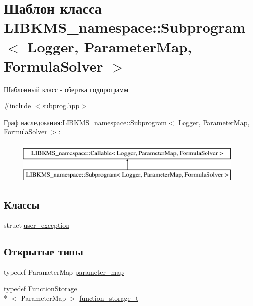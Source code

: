 \hypertarget{classLIBKMS__namespace_1_1Subprogram}{\section{Шаблон класса L\-I\-B\-K\-M\-S\-\_\-namespace\-:\-:Subprogram$<$ Logger, Parameter\-Map, Formula\-Solver $>$}
\label{classLIBKMS__namespace_1_1Subprogram}
}


Шаблонный класс -\/ обертка подпрограмм  




{\ttfamily \#include $<$subprog.\-hpp$>$}

Граф наследования\-:L\-I\-B\-K\-M\-S\-\_\-namespace\-:\-:Subprogram$<$ Logger, Parameter\-Map, Formula\-Solver $>$\-:\begin{figure}[H]
\begin{center}
\leavevmode
\includegraphics[height=2.000000cm]{classLIBKMS__namespace_1_1Subprogram}
\end{center}
\end{figure}
\subsection*{Классы}
\begin{DoxyCompactItemize}
\item 
struct \hyperlink{structLIBKMS__namespace_1_1Subprogram_1_1user__exception}{user\-\_\-exception}
\end{DoxyCompactItemize}
\subsection*{Открытые типы}
\begin{DoxyCompactItemize}
\item 
typedef Parameter\-Map \hyperlink{classLIBKMS__namespace_1_1Subprogram_a2ee2b32579888fcf68d85338b37b505c}{parameter\-\_\-map}
\item 
typedef \hyperlink{classLIBKMS__namespace_1_1FunctionStorage}{Function\-Storage}\\*
$<$ Parameter\-Map $>$ \hyperlink{classLIBKMS__namespace_1_1Subprogram_a6233a24c21954444f64217e7af397349}{function\-\_\-storage\-\_\-t}
\end{DoxyCompactItemize}
